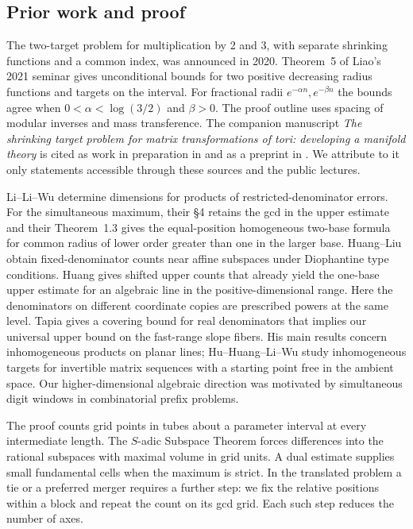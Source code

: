 \documentclass[11pt,reqno,a4paper]{amsart}
\theoremstyle{remark}
\numberwithin{equation}{section}
\begin{document}
\subsection{Prior work and proof}
The two-target problem for multiplication by 2 and 3, with separate shrinking functions and a common index, was announced in 2020. Theorem~5 of Liao's 2021 seminar \cite{Liao} gives unconditional bounds for two positive decreasing radius functions and targets on the interval. For fractional radii \(e^{-\alpha n},e^{-\beta n}\) the bounds agree when \(0<\alpha<\log(3/2)\) and \(\beta>0\). The proof outline uses spacing of modular inverses and mass transference. The companion manuscript \emph{The shrinking target problem for matrix transformations of tori: developing a manifold theory} is cited as work in preparation in \cite[ref.~32]{LLVZ} and as a preprint in \cite[ref.~18, preprint version]{LLW}. We attribute to it only statements accessible through these sources and the public lectures.

Li--Li--Wu \cite{LLW} determine dimensions for products of restricted-denominator errors. For the simultaneous maximum, their \S4 retains the gcd in the upper estimate and their Theorem~1.3 gives the equal-position homogeneous two-base formula for common radius of lower order greater than one in the larger base. Huang--Liu \cite[Theorem~7]{HL} obtain fixed-denominator counts near affine subspaces under Diophantine type conditions. Huang \cite[Theorems~3.1(b), 3.2(b)]{Huang} gives shifted upper counts that already yield the one-base upper estimate for an algebraic line in the positive-dimensional range. Here the denominators on different coordinate copies are prescribed powers at the same level. Tapia \cite[\S3.1.1, Lemma~2]{Tapia} gives a covering bound for real denominators that implies our universal upper bound on the fast-range slope fibers. His main results concern inhomogeneous products on planar lines; Hu--Huang--Li--Wu \cite{HHLW} study inhomogeneous targets for invertible matrix sequences with a starting point free in the ambient space. Our higher-dimensional algebraic direction was motivated by simultaneous digit windows in combinatorial prefix problems.

The proof counts grid points in tubes about a parameter interval at every intermediate length. The \(S\)-adic Subspace Theorem forces differences into the rational subspaces with maximal volume in grid units. A dual estimate supplies small fundamental cells when the maximum is strict. In the translated problem a tie or a preferred merger requires a further step: we fix the relative positions within a block and repeat the count on its gcd grid. Each such step reduces the number of axes.
\end{document}

